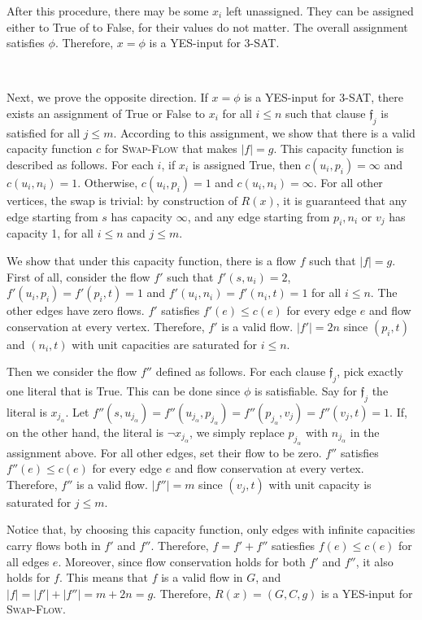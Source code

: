 \documentclass{article}
\begin{document}
After this procedure, there may be some $x_i$ left unassigned. They can be assigned either to True of to False, for their values do not matter. The overall assignment satisfies $\phi$. Therefore, $x=\phi$ is a YES-input for \textsc{3-SAT}.

~

Next, we prove the opposite direction. If $x=\phi$ is a YES-input for \textsc{3-SAT}, there exists an assignment of True or False to $x_i$ for all $i\leqslant n$ such that clause $\mathfrak{f}_j$ is satisfied for all $j\leqslant m$. According to this assignment, we show that there is a valid capacity function $c$ for \textsc{Swap-Flow} that makes $|f|=g$. This capacity function is described as follows. For each $i$, if $x_i$ is assigned True, then $c(u_i,p_i)=\infty$ and $c(u_i,n_i)=1$. Otherwise, $c(u_i,p_i)=1$ and $c(u_i,n_i)=\infty$. For all other vertices, the swap is trivial: by construction of $R(x)$, it is guaranteed that any edge starting from $s$ has capacity $\infty$, and any edge starting from $p_i,n_i$ or $v_j$ has capacity 1, for all $i\leqslant n$ and $j\leqslant m$.

We show that under this capacity function, there is a flow $f$ such that $|f|=g$. First of all, consider the flow $f'$ such that $f'(s,u_i)=2$, $f'(u_i,p_i)=f'(p_i,t)=1$ and $f'(u_i,n_i)=f'(n_i,t)=1$ for all $i\leqslant n$. The other edges have zero flows. $f'$ satisfies $f'(e)\leqslant c(e)$ for every edge $e$ and flow conservation at every vertex. Therefore, $f'$ is a valid flow. $|f'|=2n$ since $(p_i,t)$ and $(n_i,t)$ with unit capacities are saturated for $i\leqslant n$.

Then we consider the flow $f''$ defined as follows. For each clause $\mathfrak{f}_j$, pick exactly one literal that is True. This can be done since $\phi$ is satisfiable. Say for $\mathfrak{f}_j$ the literal is $x_{j_\alpha}$. Let $f''(s,u_{j_\alpha})=f''(u_{j_\alpha},p_{j_\alpha})=f''(p_{j_\alpha},v_j)=f''(v_j,t)=1$. If, on the other hand, the literal is $\neg x_{j_\alpha}$, we simply replace $p_{j_\alpha}$ with $n_{j_\alpha}$ in the assignment above. For all other edges, set their flow to be zero. $f''$ satisfies $f''(e)\leqslant c(e)$ for every edge $e$ and flow conservation at every vertex. Therefore, $f''$ is a valid flow. $|f''|=m$ since $(v_j,t)$ with unit capacity is saturated for $j\leqslant m$.

Notice that, by choosing this capacity function, only edges with infinite capacities carry flows both in $f'$ and $f''$. Therefore, $f=f'+f''$ satiesfies $f(e)\leqslant c(e)$ for all edges $e$. Moreover, since flow conservation holds for both $f'$ and $f''$, it also holds for $f$. This means that $f$ is a valid flow in $G$, and $|f|=|f'|+|f''|=m+2n=g$. Therefore, $R(x)=(G,C,g)$ is a YES-input for \textsc{Swap-Flow}.
\end{document}
